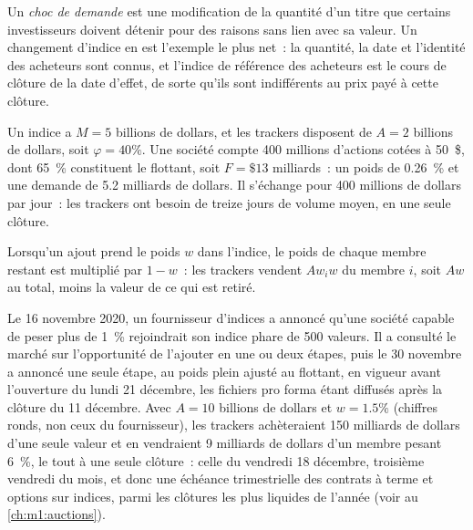 \begin{definition}\label{def:m1:index-construction-and-rebalancing:shock}
Un \emph{choc de demande} est une modification de la quantité
d'un titre que certains investisseurs doivent détenir pour des raisons sans lien avec sa valeur. Un
changement d'indice en est l'exemple le plus net~: la quantité, la date et l'identité
des acheteurs sont connus, et l'indice de référence des acheteurs est le cours de clôture de
la date d'effet, de sorte qu'ils sont indifférents au prix payé à cette
clôture.
\end{definition}

\begin{example}\label{ex:m1:index-construction-and-rebalancing:thirteen}
Un indice a $M = 5$ billions de dollars, et les trackers disposent de $A = 2$ billions de dollars, soit
$\varphi = 40\%$. Une société compte 400 millions d'actions cotées à 50~\$, dont 65~\% constituent le
flottant, soit $F = \$13$ milliards~: un poids de 0.26~\% et une demande de 5.2
milliards de dollars. Il s'échange pour 400 millions de dollars par jour~: les trackers
ont besoin de treize jours de volume moyen, en une seule clôture.
\end{example}

\begin{proposition}\label{prop:m1:index-construction-and-rebalancing:funding}
Lorsqu'un ajout prend le poids $w$ dans l'indice, le poids de chaque membre restant
est multiplié par $1-w$~: les trackers vendent $Aw_iw$ du membre $i$, soit $Aw$
au total, moins la valeur de ce qui est retiré.
\end{proposition}

\begin{example}\label{ex:m1:index-construction-and-rebalancing:large}
Le 16 novembre 2020, un fournisseur d'indices a annoncé qu'une société capable de peser
plus de 1~\% rejoindrait son indice phare de 500 valeurs. Il
a consulté le marché sur l'opportunité de l'ajouter en une ou deux étapes, puis le 30
novembre a annoncé une seule étape, au poids plein ajusté au flottant, en vigueur
avant l'ouverture du lundi 21 décembre, les fichiers pro forma étant diffusés
après la clôture du 11 décembre. Avec $A = 10$ billions de dollars et $w = 1.5\%$
(chiffres ronds, non ceux du fournisseur), les trackers achèteraient 150 milliards de dollars
d'une seule valeur et en vendraient 9 milliards de dollars d'un membre pesant 6~\%, le tout à une seule clôture~:
celle du vendredi 18 décembre, troisième vendredi du mois, et donc une échéance trimestrielle
des contrats à terme et options sur indices, parmi les clôtures les plus liquides de
l'année (voir au \cref{ch:m1:auctions}).
\end{example}

